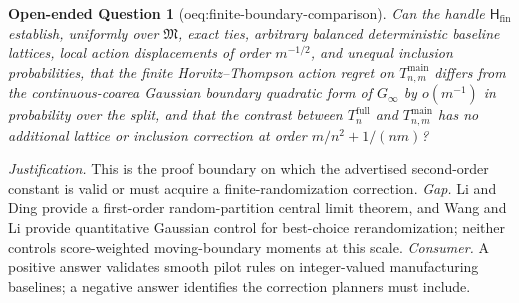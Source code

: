 \documentclass{article}
\newtheorem{openendedquestion}{Open-ended Question}
\begin{document}
\begin{openendedquestion}[oeq:finite-boundary-comparison]\label{oeq:finite-boundary-comparison}
Can the handle \(\mathsf H_{\mathrm{fin}}\) establish, uniformly over \(\mathfrak M\), exact ties, arbitrary balanced deterministic baseline lattices, local action displacements of order \(m^{-1/2}\), and unequal inclusion probabilities, that the finite Horvitz--Thompson action regret on \(T_{n,m}^{\mathrm{main}}\) differs from the continuous-coarea Gaussian boundary quadratic form of \(G_{\infty}\) by \(o(m^{-1})\) in probability over the split, and that the contrast between \(T_n^{\mathrm{full}}\) and \(T_{n,m}^{\mathrm{main}}\) has no additional lattice or inclusion correction at order \(m/n^2+1/(nm)\)?
\end{openendedquestion}
\par\smallskip\noindent \textit{Justification.} This is the proof boundary on which the advertised second-order constant is valid or must acquire a finite-randomization correction. \textit{Gap.} Li and Ding provide a first-order random-partition central limit theorem, and Wang and Li provide quantitative Gaussian control for best-choice rerandomization; neither controls score-weighted moving-boundary moments at this scale. \textit{Consumer.} A positive answer validates smooth pilot rules on integer-valued manufacturing baselines; a negative answer identifies the correction planners must include.
\end{document}
